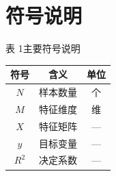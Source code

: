 \section{符号说明}

\newpage
\begin{center}
  {\fontsize{10.5pt}{12.6pt}\heiti 表 1\quad 主要符号说明}\\[0.6em]
  \begin{tabular}{ccc}
    \toprule
    \textbf{符号} & \textbf{含义} & \textbf{单位} \\
    \midrule
    $N$   & 样本数量 & 个 \\
    $M$   & 特征维度 & 维 \\
    $X$   & 特征矩阵 & --- \\
    $y$   & 目标变量 & --- \\
    $R^2$ & 决定系数 & --- \\
    \bottomrule
  \end{tabular}
\end{center}
